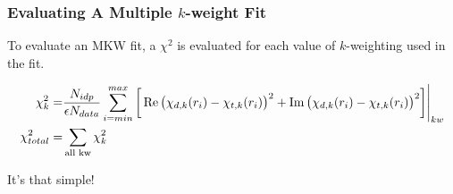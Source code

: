 \documentclass[10pt, xcolor=x11names, compress]{beamer}
\begin{document}
\begin{frame}
  \frametitle{Evaluating A Multiple $k$-weight Fit}

  To evaluate an MKW fit, a $\chi^2$ is evaluated for each value of
  $k$-weighting used in the fit.
  
  {\small
    \begin{align}
      \chi^2_k =& \frac{N_{idp}}{\epsilon N_{data}}
      \sum\limits_{i=min}^{max} 
      \bigg[\Re\big(\chi_{d,k}(r_i)-\chi_{t,k}(r_i)\big)^2 + 
      \Im\big(\chi_{d,k}(r_i)-\chi_{t,k}(r_i)\big)^2\bigg]\Biggl|_{kw}
      \notag \\
      \chi^2_{total} =& \sum\limits_{\textrm{all kw}} \chi^2_k
    \end{align}}

  \begin{exampleblock}{}
    \begin{center}
      It's that simple!
    \end{center}
  \end{exampleblock}
\end{frame}
\end{document}
